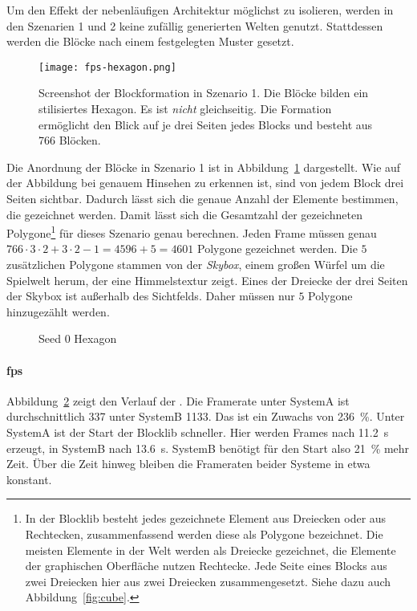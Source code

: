 
Um den Effekt der nebenläufigen Architektur möglichst zu isolieren, werden in den Szenarien 1 und 2 keine zufällig generierten Welten genutzt. Stattdessen werden die Blöcke nach einem festgelegten Muster gesetzt.

\begin{figure}
	\centering
	\texttt{[image: fps-hexagon.png]}
	\caption{Screenshot der Blockformation in Szenario 1. Die Blöcke bilden ein stilisiertes Hexagon. Es ist \emph{nicht} gleichseitig. Die Formation ermöglicht den Blick auf je drei Seiten jedes Blocks und besteht aus 766 Blöcken.}\label{fig:hexagon}
\end{figure}
Die Anordnung der Blöcke in Szenario 1 ist in Abbildung~\ref{fig:hexagon} dargestellt. Wie auf der Abbildung bei genauem Hinsehen zu erkennen ist, sind von jedem Block drei Seiten sichtbar. Dadurch lässt sich die genaue Anzahl der Elemente bestimmen, die gezeichnet werden. Damit lässt sich die Gesamtzahl der gezeichneten Polygone\footnote{In der Blocklib besteht jedes gezeichnete Element aus Dreiecken oder aus Rechtecken, zusammenfassend werden diese als Polygone bezeichnet. Die meisten Elemente in der Welt werden als Dreiecke gezeichnet, die Elemente der graphischen Oberfläche nutzen Rechtecke. Jede Seite eines Blocks aus zwei Dreiecken hier aus zwei Dreiecken zusammengesetzt. Siehe dazu auch Abbildung~\ref{fig:cube}.} für dieses Szenario genau berechnen. Jeden Frame müssen genau $766\cdot3\cdot2 + 3\cdot2-1 = 4596 +5 = 4601$ Polygone gezeichnet werden. Die $5$ zusätzlichen Polygone stammen von der \emph{Skybox}, einem großen Würfel um die Spielwelt herum, der eine Himmelstextur zeigt. Eines der Dreiecke der drei Seiten der Skybox ist außerhalb des Sichtfelds. Daher müssen nur $5$ Polygone hinzugezählt werden.

\begin{figure}[!htbp]
	\caption{Seed 0 Hexagon}\label{fig:seed-0-hexagon-fps}
\end{figure}
\paragraph{\ac{fps}} Abbildung~\ref{fig:seed-0-hexagon-fps} zeigt den Verlauf der \si{\fps}. Die Framerate unter SystemA ist durchschnittlich \SI{337}{\fps} unter SystemB \SI{1133}{\fps}. Das ist ein Zuwachs von \SI{236}{\percent}. Unter SystemA ist der Start der Blocklib schneller. Hier werden Frames nach \SI{11,2}{\second} erzeugt, in SystemB nach \SI{13,6}{\second}. SystemB benötigt für den Start also \SI{21}{\percent} mehr Zeit. Über die Zeit hinweg bleiben die Frameraten beider Systeme in etwa konstant.


